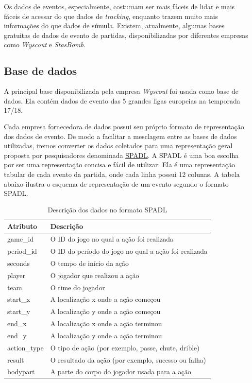 \documentclass{article}
\begin{document}
Os dados de eventos, especialmente, costumam ser mais fáceis de lidar e mais
fáceis de acessar do que dados de \textit{tracking}, enquanto trazem muito mais
informações do que dados de súmula. Existem, atualmente, algumas bases
gratuitas de dados de evento de partidas, disponibilizadas por diferentes
empresas como \textit{Wyscout} e \textit{StasBomb}.

\subsection{Base de dados}

A principal base disponibilizada pela empresa \textit{Wyscout} foi usada como
base de dados. Ela contém dados de evento das 5 grandes ligas europeias na
temporada 17/18.

Cada empresa fornecedora de dados possui seu próprio formato de representação
dos dados de evento. De modo a facilitar a mesclagem entre as bases de dados
utilizadas, iremos converter os dados coletados para uma representação geral
proposta por pesquisadores denominada
\href{https://socceraction.readthedocs.io/en/latest/documentation/spadl/spadl.html}{SPADL}.
A SPADL é uma boa escolha por ser uma representação concisa e fácil de
utilizar. Ela é uma representação tabular de cada evento da partida, onde cada
linha possui 12 colunas. A tabela abaixo ilustra o esquema de representação de
um evento segundo o formato SPADL.

\begin{table}[H]
	\centering
	\begin{tabular}{|l|l|}
		\hline
		\textbf{Atributo} & \textbf{Descrição}
		\\
		\hline
		game\_id          & O ID do jogo no qual a ação foi realizada
		\\
		\hline
		period\_id        & O ID do período do jogo no qual a ação foi
		realizada
		\\
		\hline
		seconds           & O tempo de início da ação
		\\
		\hline
		player            & O jogador que realizou a ação
		\\
		\hline
		team              & O time do jogador
		\\
		\hline
		start\_x          & A localização x onde a ação começou
		\\
		\hline
		start\_y          & A localização y onde a ação começou
		\\
		\hline
		end\_x            & A localização x onde a ação terminou
		\\
		\hline
		end\_y            & A localização y onde a ação terminou
		\\
		\hline
		action\_type      & O tipo de ação (por exemplo, passe, chute,
		drible)
		\\
		\hline
		result            & O resultado da ação (por exemplo, sucesso
		ou falha)
		\\
		\hline
		bodypart          & A parte do corpo do jogador usada para a
		ação
		\\
		\hline
	\end{tabular}
	\caption{Descrição dos dados no formato SPADL}
	\label{tab:atributosSPADL}
\end{table}
\end{document}
